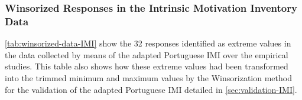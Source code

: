 \subsubsection*{Winsorized Responses in the Intrinsic Motivation Inventory Data}

\autoref{tab:winsorized-data-IMI} show the 32 responses identified as extreme values in the data collected by means of the adapted Portuguese IMI over the empirical studies. This table also shows how these extreme values had been transformed into the trimmed minimum and maximum values by the Winsorization method for the validation of the adapted Portuguese IMI detailed in \autoref{sec:validation-IMI}.

